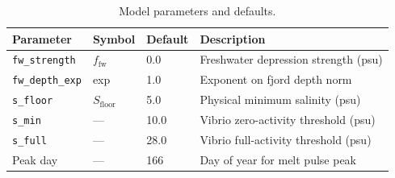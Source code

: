 \documentclass[11pt,letterpaper]{article}
\begin{document}
\begin{table}[H]
\centering
\caption{Model parameters and defaults.}
\begin{tabular}{llll}
\toprule
\textbf{Parameter} & \textbf{Symbol} & \textbf{Default} & \textbf{Description} \\
\midrule
\texttt{fw\_strength}   & $f_\mathrm{fw}$ & 0.0    & Freshwater depression strength (psu) \\
\texttt{fw\_depth\_exp} & exp              & 1.0    & Exponent on fjord depth norm \\
\texttt{s\_floor}       & $S_\mathrm{floor}$ & 5.0  & Physical minimum salinity (psu) \\
\texttt{s\_min}         & ---              & 10.0   & Vibrio zero-activity threshold (psu) \\
\texttt{s\_full}        & ---              & 28.0   & Vibrio full-activity threshold (psu) \\
Peak day                & ---              & 166    & Day of year for melt pulse peak \\
\bottomrule
\end{tabular}
\end{table}
\end{document}
